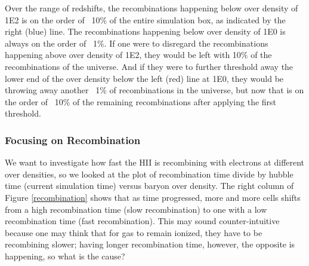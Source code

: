 \documentclass[letterpaper,10pt]{article}
\renewcommand{\(}{\left(}
\renewcommand{\)}{\right)}
\begin{document}

Over the range of redshifts, the recombinations happening below over density of 1E2 is on the order of ~10\% of the entire simulation box, as indicated by the right (blue) line.  The recombinations happening below over density of 1E0 is always on the order of ~1\%.  If one were to disregard the recombinations happening above over density of 1E2, they would be left with 10\% of the recombinations of the universe.  And if they were to further threshold away the lower end of the over density below the left (red) line at 1E0, they would be throwing away another ~1\% of recombinations in the universe, but now that is on the order of ~10\% of the remaining recombinations after applying the first threshold.

\subsubsection{Focusing on Recombination}
\label{FocusingonRecombination}

We want to investigate how fast the H{\footnotesize II} is recombining with electrons at different over densities, so we looked at the plot of recombination time divide by hubble time (current simulation time) versus baryon over density.  The right column of Figure \ref{recombination} shows that as time progressed, more and more cells shifts from a high recombination time (slow recombination) to one with a low recombination time (fast recombination).  This may sound counter-intuitive because one may think that for gas to remain ionized, they have to be recombining slower; having longer recombination time, however, the opposite is happening, so what is the cause?
\end{document}
